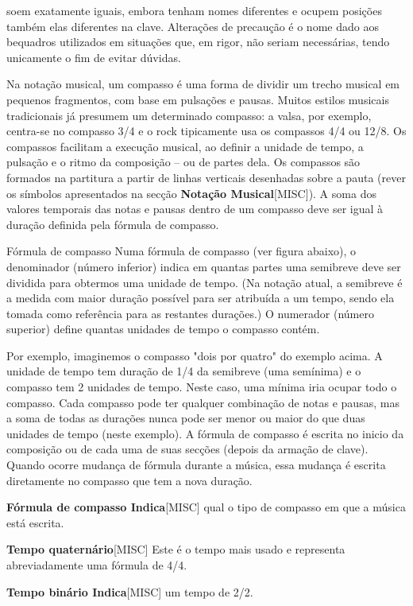 \documentclass[a4paper,12pt]{article}
\begin{document}
soem exatamente iguais, embora tenham nomes diferentes e ocupem posições também elas diferentes na clave. Alterações de precaução é o nome dado aos bequadros utilizados em situações que, em rigor, não seriam necessárias, tendo unicamente o fim de evitar dúvidas.

Na notação musical, um compasso é uma forma de dividir um trecho musical em pequenos fragmentos, com base em pulsações e pausas. Muitos estilos musicais tradicionais já presumem um determinado compasso: a valsa, por exemplo, centra-se no compasso 3/4 e o rock tipicamente usa os compassos 4/4 ou 12/8. Os compassos facilitam a execução musical, ao definir a unidade de tempo, a pulsação e o ritmo da composição -- ou de partes dela. Os compassos são formados na partitura a partir de linhas verticais desenhadas sobre a pauta (rever os símbolos apresentados na secção \textbf{Notação Musical}\textsc{[MISC]}). A soma dos valores temporais das notas e pausas dentro de um compasso deve ser igual à duração definida pela fórmula de compasso.

Fórmula de compasso Numa fórmula de compasso (ver figura abaixo), o denominador (número inferior) indica em quantas partes uma semibreve deve ser dividida para obtermos uma unidade de tempo. (Na notação atual, a semibreve é a medida com maior duração possível para ser atribuída a um tempo, sendo ela tomada como referência para as restantes durações.) O numerador (número superior) define quantas unidades de tempo o compasso contém.

Por exemplo, imaginemos o compasso "dois por quatro" do exemplo acima. A unidade de tempo tem duração de 1/4 da semibreve (uma semínima) e o compasso tem 2 unidades de tempo. Neste caso, uma mínima iria ocupar todo o compasso. Cada compasso pode ter qualquer combinação de notas e pausas, mas a soma de todas as durações nunca pode ser menor ou maior do que duas unidades de tempo (neste exemplo). A fórmula de compasso é escrita no inicio da composição ou de cada uma de suas secções (depois da armação de clave). Quando ocorre mudança de fórmula durante a música, essa mudança é escrita diretamente no compasso que tem a nova duração.

\textbf{Fórmula de compasso Indica}\textsc{[MISC]} qual o tipo de compasso em que a música está escrita.

\textbf{Tempo quaternário}\textsc{[MISC]} Este é o tempo mais usado e representa abreviadamente uma fórmula de 4/4.

\textbf{Tempo binário Indica}\textsc{[MISC]} um tempo de 2/2.
\end{document}
